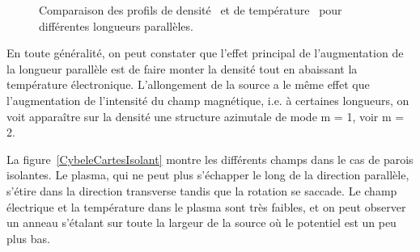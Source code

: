 \begin{refsection}
\begin{figure}[!htbp]
  \centering
    \caption{Comparaison des profils de
    densité~ et de
    température~ pour différentes
    longueurs parallèles.}
    \label{4-CybeleProfileZ}
\end{figure}

En toute généralité, on peut constater que l'effet
principal de l'augmentation de la longueur parallèle est de faire monter la
densité tout en abaissant la température électronique.
L'allongement de la source a le même effet que l'augmentation de l'intensité du
champ magnétique, i.e. à certaines longueurs, on voit apparaître sur la densité
une structure azimutale de mode m = 1, voir m = 2.

La figure~\ref{CybeleCartesIsolant} montre les différents champs dans le cas de
parois isolantes. Le plasma, qui ne peut plus s'échapper le long de la direction
parallèle, s'étire dans la direction transverse tandis que la rotation se
saccade.
Le champ électrique et la température dans le plasma sont très faibles, et on
peut observer un anneau s'étalant sur toute la largeur de la source où le
potentiel est un peu plus bas.


\end{refsection}
